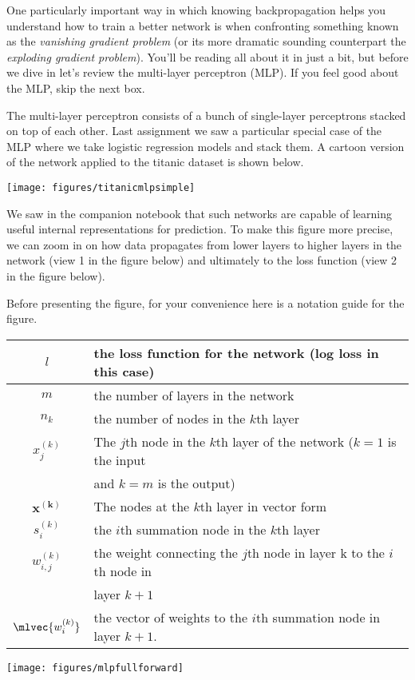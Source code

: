 \documentclass[assignment07_Solutions]{subfiles}
\begin{document}
One particularly important way in which knowing backpropagation helps you understand how to train a better network is when confronting something known as the \emph{vanishing gradient problem} (or its more dramatic sounding counterpart the \emph{exploding gradient problem}).  You'll be reading all about it in just a bit, but before we dive in let's review the multi-layer perceptron (MLP).  If you feel good about the MLP, skip the next box.

\begin{recall}
The multi-layer perceptron consists of a bunch of single-layer perceptrons stacked on top of each other.  Last assignment we saw a particular special case of the MLP where we take logistic regression models and stack them.  A cartoon version of the network applied to the titanic dataset is shown below.

\begin{center}
\texttt{[image: figures/titanicmlpsimple]}
\end{center}

We saw in the companion notebook that such networks are capable of learning useful internal representations for prediction.  To make this figure more precise, we can zoom in on how data propagates from lower layers to higher layers in the network (view 1 in the figure below) and ultimately to the loss function (view 2 in the figure below).

\vspace{1em}

Before presenting the figure, for your convenience here is a notation guide for the figure.
\vspace{1em}

\begin{tabular}{| c | l |}
\hline
$l$ & the loss function for the network (log loss in this case) \\
\hline
$m$ & the number of layers in the network \\
\hline
$n_{k}$ & the number of nodes in the $k$th layer \\
\hline
$x_j^{(k)}$& The $j$th node in the $k$th layer of the network ($k = 1$ is the input \\
&and $k = m$ is the output) \\
\hline
$\mathbf{x^{(k)}}$ & The nodes at the $k$th layer in vector form \\
\hline
$s_{i}^{(k)}$ & the $i$th summation node in the $k$th layer \\
\hline
$w_{i,j}^{(k)}$ & the weight connecting the $j$th node in layer k to the $i$th node in\\
&  layer $k+1$ \\
\hline
$\mlvec{w_{i}^{(k)}}$ & the vector of weights to the $i$th summation node in layer $k+1$.\\
\hline
\end{tabular}

\begin{center}
\texttt{[image: figures/mlpfullforward]}
\end{center}

\end{recall}
\end{document}
